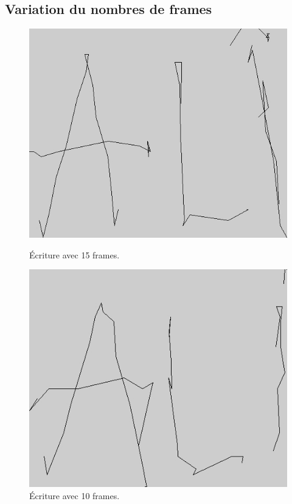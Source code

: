 \documentclass[12pt,a4paper,oneside]{book}
\begin{document}
	\subsection{Variation du nombres de frames}
	
	\begin{figure}[H]
		\begin{minipage}[H]{0.5\linewidth}
			\centering
			\includegraphics[scale=0.92]{12frame.jpg}
			\caption{Écriture avec 15 frames.}
			\label{fig1}
		\end{minipage}
		\begin{minipage}[H]{0.5\linewidth}
			\centering
			\includegraphics[scale=0.99]{8frame.jpg}
			\caption{Écriture avec 10 frames.}
		\end{minipage}
		
	\end{figure}
	
\end{document}
